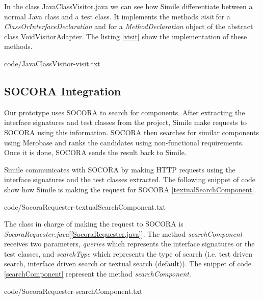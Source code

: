 In the class JavaClassVisitor.java we can see how Simile differentiate between a normal Java class and a test class. It implements the methods \emph{visit} for a \emph{ClassOrInterfaceDeclaration} and for a \emph{MethodDeclaration} object of the abstract class VoidVisitorAdapter. The listing \ref{visit} show the implementation of these methods.


{code/JavaClassVisitor-visit.txt}

\subsection{SOCORA Integration}
\label{socora-integration}
Our prototype uses SOCORA to search for components. After extracting the interface signatures and test classes from the project, Simile make requests to SOCORA using this information. SOCORA then searches for similar components using Merobase and ranks the candidates using non-functional requirements. Once it is done, SOCORA sends the result back to Simile.

Simile communicates with SOCORA by making HTTP requests using the interface signatures and the test classes extracted. The following snippet of code show how Simile is making the request for SOCORA \ref{textualSearchComponent}.


{code/SocoraRequester-textualSearchComponent.txt}

The class in charge of making the request to SOCORA is \emph{SocoraRequester.java}[\ref{SocoraRequester.java}]. The method \emph{searchComponent} receives two parameters, \emph{queries} which represents the interface signatures or the test classes, and \emph{searchType} which represents the type of search (i.e. test driven search, interface driven search or textual search (default)). The snippet of code \ref{searchComponent} represent the method \emph{searchComponent}.


{code/SocoraRequester-searchComponent.txt}

